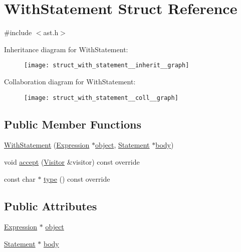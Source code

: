 \hypertarget{struct_with_statement}{}\section{With\+Statement Struct Reference}
\label{struct_with_statement}


{\ttfamily \#include $<$ast.\+h$>$}



Inheritance diagram for With\+Statement\+:\nopagebreak
\begin{figure}[H]
\begin{center}
\leavevmode
\texttt{[image: struct\_with\_statement\_\_inherit\_\_graph]}
\end{center}
\end{figure}


Collaboration diagram for With\+Statement\+:\nopagebreak
\begin{figure}[H]
\begin{center}
\leavevmode
\texttt{[image: struct\_with\_statement\_\_coll\_\_graph]}
\end{center}
\end{figure}
\subsection*{Public Member Functions}
\begin{DoxyCompactItemize}
\item 
\hyperlink{struct_with_statement_a30feda3f34febbab2584ea274fcd507d}{With\+Statement} (\hyperlink{struct_expression}{Expression} $\ast$\hyperlink{struct_with_statement_a1563aab5799cbe5112e7a0429f4956bd}{object}, \hyperlink{struct_statement}{Statement} $\ast$\hyperlink{struct_with_statement_af7976ff82c99c995f603c2d32e8122ff}{body})
\item 
void \hyperlink{struct_with_statement_a07d3015de8ea5d3f27a0bab8719665f3}{accept} (\hyperlink{struct_visitor}{Visitor} \&visitor) const override
\item 
const char $\ast$ \hyperlink{struct_with_statement_ae26ccb907f2cbc302011c77c7b356ad1}{type} () const override
\end{DoxyCompactItemize}
\subsection*{Public Attributes}
\begin{DoxyCompactItemize}
\item 
\hyperlink{struct_expression}{Expression} $\ast$ \hyperlink{struct_with_statement_a1563aab5799cbe5112e7a0429f4956bd}{object}
\item 
\hyperlink{struct_statement}{Statement} $\ast$ \hyperlink{struct_with_statement_af7976ff82c99c995f603c2d32e8122ff}{body}
\end{DoxyCompactItemize}


